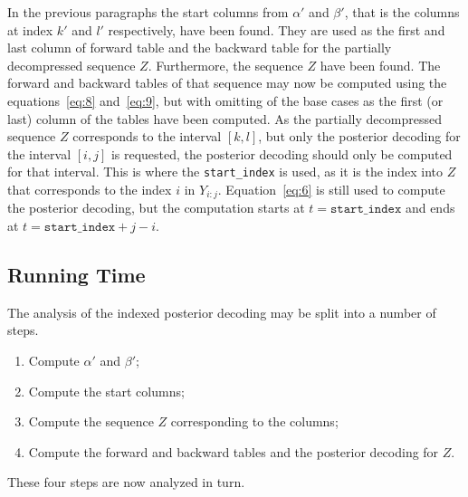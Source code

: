 In the previous paragraphs the start columns from $\alpha'$ and $\beta'$, that
is the columns at index $k'$ and $l'$ respectively, have been found. They are
used as the first and last column of forward table and the backward table for
the partially decompressed sequence $Z$. Furthermore, the sequence $Z$ have
been found. The forward and backward tables of that sequence may now be
computed using the equations~\eqref{eq:8} and~\eqref{eq:9}, but with omitting
of the base cases as the first (or last) column of the tables have been
computed. As the partially decompressed sequence $Z$ corresponds to the
interval $[k, l]$, but only the posterior decoding for the interval $[i, j]$ is
requested, the posterior decoding should only be computed for that interval.
This is where the \texttt{start\_index} is used, as it is the index into $Z$
that corresponds to the index $i$ in $Y_{i:j}$. Equation~\eqref{eq:6}
is still used to compute the posterior decoding, but the computation starts at
$t = \mathtt{start\_index}$ and ends at $t = \mathtt{start\_index} + j - i$.

\subsection{Running Time}
\label{sec:running-time-2}

The analysis of the indexed posterior decoding may be split into a number of
steps.
\begin{enumerate}
\item Compute $\alpha'$ and $\beta'$;
\item Compute the start columns;
\item Compute the sequence $Z$ corresponding to the columns;
\item Compute the forward and backward tables and the posterior decoding for
  $Z$.
\end{enumerate}
These four steps are now analyzed in turn.

